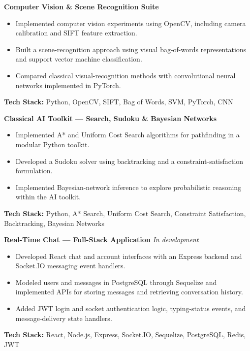 \noindent\textbf{Computer Vision \& Scene Recognition Suite}
\begin{itemize}[leftmargin=*,nosep,topsep=3pt]
  \item Implemented computer vision experiments using OpenCV, including camera calibration and SIFT feature extraction.
  \item Built a scene-recognition approach using visual bag-of-words representations and support vector machine classification.
  \item Compared classical visual-recognition methods with convolutional neural networks implemented in PyTorch.
\end{itemize}
\noindent\textbf{Tech Stack:} Python, OpenCV, SIFT, Bag of Words, SVM, PyTorch, CNN\par\medskip

\noindent\textbf{Classical AI Toolkit --- Search, Sudoku \& Bayesian Networks}
\begin{itemize}[leftmargin=*,nosep,topsep=3pt]
  \item Implemented A* and Uniform Cost Search algorithms for pathfinding in a modular Python toolkit.
  \item Developed a Sudoku solver using backtracking and a constraint-satisfaction formulation.
  \item Implemented Bayesian-network inference to explore probabilistic reasoning within the AI toolkit.
\end{itemize}
\noindent\textbf{Tech Stack:} Python, A* Search, Uniform Cost Search, Constraint Satisfaction, Backtracking, Bayesian Networks\par\medskip

\noindent\textbf{Real-Time Chat --- Full-Stack Application} \hfill\textit{In development}
\begin{itemize}[leftmargin=*,nosep,topsep=3pt]
  \item Developed React chat and account interfaces with an Express backend and Socket.IO messaging event handlers.
  \item Modeled users and messages in PostgreSQL through Sequelize and implemented APIs for storing messages and retrieving conversation history.
  \item Added JWT login and socket authentication logic, typing-status events, and message-delivery state handlers.
\end{itemize}
\noindent\textbf{Tech Stack:} React, Node.js, Express, Socket.IO, Sequelize, PostgreSQL, Redis, JWT\par\medskip

